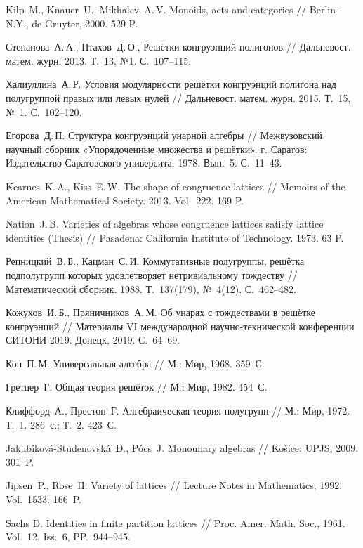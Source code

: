 \documentclass[11pt,twoside,final
]{article}
\begin{document}
\begin{thebibliography}{99}

	Kilp~M., Knauer~U., Mikhalev~A.\,V. Monoids, acts and categories // Berlin - N.Y., de Gruyter, 2000. 529 P.

	Степанова~А.\,А., Птахов~Д.\,О.,  Решётки конгруэнций полигонов // Дальневост. матем. журн. 2013. Т.~13, №1. С.~107--115.

	Халиуллина~А.\,Р. Условия модулярности решётки конгруэнций полигона над полугруппой правых или левых нулей // Дальневост. матем. журн. 2015. Т.~15, №~1. С.~102--120.

	Егорова~Д.\,П. Структура конгруэнций унарной алгебры // Межвузовский научный сборник «Упорядоченные множества и решётки». г. Саратов: Издательство Саратовского университа. 1978. Вып.~5. С.~11--43.

	Kearnes~K.\,A., Kiss~E.\,W. The shape of congruence lattices // Memoirs of the American Mathematical Society. 2013. Vol.~222. 169 P.

	Nation~J.\,B. Varieties of algebras whose congruence lattices satisfy lattice identities (Thesis) // Pasadena: California Institute of Technology. 1973. 63 P.

	Репницкий~В.\,Б., Кацман~С.\,И. Коммутативные полугруппы, решётка подполугрупп которых удовлетворяет нетривиальному тождеству // Математический сборник. 1988. Т.~137(179), №~4(12). С.~462--482.

	Кожухов~И.\,Б., Пряничников~А.\,М. Об унарах с тождествами в решётке конгруэнций // Материалы VI международной научно-технической конференции СИТОНИ-2019. Донецк, 2019. С.~64--69.

	Кон~П.\,М. Универсальная алгебра // М.: Мир, 1968. 359~С.

	Гретцер~Г. Общая теория решёток // М.: Мир, 1982. 454~С.

	Клиффорд~А., Престон~Г. Алгебраическая теория полугрупп // М.: Мир, 1972. Т.~1. 286~с.; Т.~2. 423~С.

	Jakubiková-Studenovská~D., Pócs~J. Monounary algebras // Košice: UPJS, 2009. 301~P.

	Jipsen~P., Rose~H. Variety of lattices // Lecture Notes in Mathematics, 1992. Vol.~1533. 166~P.

	Sachs D. Identities in finite partition lattices // Proc. Amer. Math. Soc., 1961. Vol.~12. Iss.~6, PP.~944--945.

\end{thebibliography}
\end{document}
